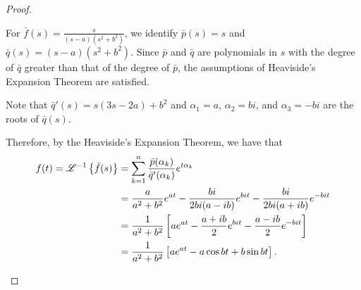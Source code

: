 \begin{proof}
\begin{enumerate}
      For $\displaystyle \bar{f}(s) = \frac{s}{(s-a)(s^2+b^2)}$, we identify $\bar{p}(s) = s$ and
      $\bar{q}(s) = (s-a)(s^2+b^2)$. Since $\bar{p}$ and $\bar{q}$ are polynomials in $s$ with the degree of $\bar{q}$
      greater than that of the degree of $\bar{p}$, the assumptions of Heaviside's Expansion Theorem are satisfied.

      Note that $\bar{q}'(s) = s(3s-2a) + b^2$ and $\alpha_1 = a$, $\alpha_2 = bi$, and $\alpha_3 = -bi$ are the roots of $\bar{q}(s)$.

      Therefore, by the Heaviside's Expansion Theorem, we have that
      \begin{align*}
        f(t) = \mathscr{L}^{-1}\left\{ {\bar{f}(s)} \right\} &= \sum_{k=1}^n \frac{\bar{p}(\alpha_k)}{\bar{q}'(\alpha_k)}e^{t\alpha_k} \\
        &= \frac{a}{a^2+b^2} e^{at} - \frac{b i}{2bi(a-ib)} e^{bi t} - \frac{bi}{2bi (a+ib)}e^{-bi t} \\
        &= \frac{1}{a^2+b^2}\left[ae^{at} - \frac{a+ib}{2} e^{bi t} - \frac{a-ib}{2}e^{-bi t}\right] \\
        &= \frac{1}{a^2+b^2} \left[ae^{at} - a\cos bt +b\sin bt\right].
      \end{align*}
  \end{enumerate}
\end{proof}
\newpage
